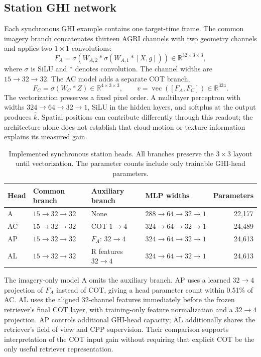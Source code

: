 \documentclass[11pt]{article}
\begin{document}
\subsection{Station GHI network}
Each synchronous GHI example contains one target-time frame. The common imagery branch concatenates thirteen AGRI channels with two geometry channels and applies two $1\times1$ convolutions:
\begin{equation}
F_A=\sigma\!\left(W_{A,2}*
\sigma\!\left(W_{A,1}*[X,g]\right)\right)
\in\mathbb R^{32\times3\times3},
\label{eq:agri-encoder}
\end{equation}
where $\sigma$ is SiLU and $*$ denotes convolution. The channel widths are $15\rightarrow32\rightarrow32$. The AC model adds a separate COT branch,
\begin{equation}
F_C=\sigma(W_C*Z)\in\mathbb R^{4\times3\times3},
\qquad
v=\operatorname{vec}([F_A,F_C])\in\mathbb R^{324}.
\label{eq:cot-encoder}
\end{equation}
The vectorization preserves a fixed pixel order. A multilayer perceptron with widths $324\rightarrow64\rightarrow32\rightarrow1$, SiLU in the hidden layers, and softplus at the output produces $\widehat k$. Spatial positions can contribute differently through this readout; the architecture alone does not establish that cloud-motion or texture information explains its measured gain.

\begin{table}[t]
\centering\small
\setlength{\tabcolsep}{4pt}
\caption{Implemented synchronous station heads. All branches preserve the $3\times3$ layout until vectorization. The parameter counts include only trainable GHI-head parameters.}
\label{tab:heads}
\begin{tabular}{llllr}
\toprule
Head & Common branch & Auxiliary branch & MLP widths & Parameters\\
\midrule
A & $15\to32\to32$ & None & $288\to64\to32\to1$ & 22,177\\
AC & $15\to32\to32$ & COT $1\to4$ & $324\to64\to32\to1$ & 24,489\\
AP & $15\to32\to32$ & $F_A$: $32\to4$ & $324\to64\to32\to1$ & 24,613\\
AL & $15\to32\to32$ & R features $32\to4$ & $324\to64\to32\to1$ & 24,613\\
\bottomrule
\end{tabular}
\end{table}

The imagery-only model A omits the auxiliary branch. AP uses a learned $32\rightarrow4$ projection of $F_A$ instead of COT, giving a head parameter count within 0.51\% of AC. AL uses the aligned 32-channel features immediately before the frozen retriever's final COT layer, with training-only feature normalization and a $32\rightarrow4$ projection. AP controls additional GHI-head capacity; AL additionally shares the retriever's field of view and CPP supervision. Their comparison supports interpretation of the COT input gain without requiring that explicit COT be the only useful retriever representation.
\end{document}

